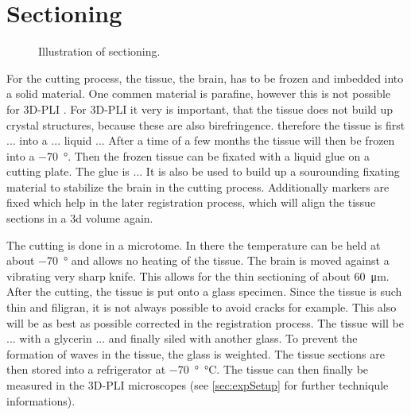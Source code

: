 \section{Sectioning}
%
\begin{figure}[!t]
	\centering
    \def\tikzwidth{0.75\textwidth}
	\caption{Illustration of sectioning.}
	\label{fig:brain_sectioning}
\end{figure}
% 
For the cutting process, the tissue, \ie{} the brain, has to be frozen and imbedded into a solid material.
One commen material is parafine, however this is not possible for \ac{3D-PLI} \dummy[why?]{}.
For \ac{3D-PLI} it very is important, that the tissue does not build up crystal structures, because these are also birefringence.
therefore the tissue is first ... into a ... liquid ...
After a time of a few months the tissue will then be frozen into a \SI{-70}{\degree}.
Then the frozen tissue can be fixated with a liquid glue on a cutting plate.
The glue is ...
It is also be used to build up a sourounding fixating material to stabilize the brain in the cutting process.
Additionally markers are fixed which help in the later registration process, which will align the tissue sections in a 3d volume again.
\par
The cutting is done in a microtome.
In there the temperature can be held at about \SI{-70}{\degree} and allows no heating of the tissue.
The brain is moved against a vibrating very sharp knife.
This allows for the thin sectioning of about \SI{60}{\micro\meter}.
After the cutting, the tissue is put onto a glass specimen.
Since the tissue is such thin and filigran, it is not always possible to avoid cracks for example.
This also will be as best as possible corrected in the registration process.
The tissue will be ... with a glycerin ... and finally siled with another glass.
To prevent the formation of waves in the tissue, the glass is weighted.
The tissue sections are then stored into a refrigerator at \SI{-70}{\degree\celsius}.
The tissue can then finally be measured in the \ac{3D-PLI} microscopes (see \cref{sec:expSetup} for further techniqule informations).
% 
% 
